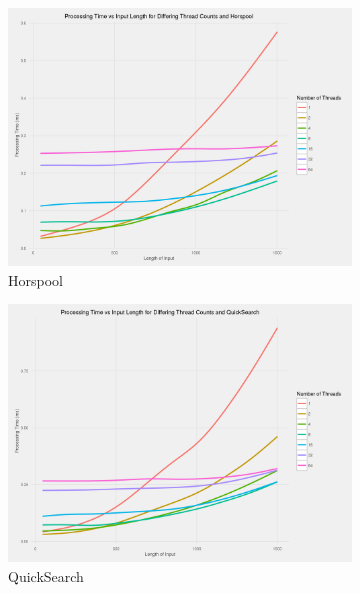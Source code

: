 \documentclass[11pt]{article}
\begin{document}
\begin{figure}[!htb]
  \centering
  \begin{subfigure}[b]{0.48\textwidth}
      \includegraphics[width=\textwidth]{images/scatter_elapsed_vs_input_length_many_cores_Horspool}
      \caption{Horspool}
  \end{subfigure}
  \begin{subfigure}[b]{0.48\textwidth}
      \includegraphics[width=\textwidth]{images/scatter_elapsed_vs_input_length_many_cores_QuickSearch}
      \caption{QuickSearch}
  \end{subfigure}
  ~
  \begin{subfigure}[b]{0.48\textwidth}

\end{subfigure}
\end{figure}
\end{document}
